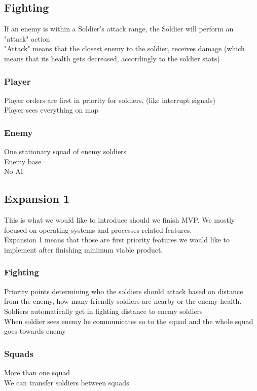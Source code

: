 \documentclass{article}
\begin{document}
\subsection{Fighting}
If an enemy is within a Soldier's attack range, the Soldier will perform an "attack" action\\
"Attack" means that the closest enemy to the soldier, receives damage (which means that its health gets decreased, accordingly to the soldier stats)

\subsubsection{Player}
Player orders are first in priority for soldiers, (like interrupt signals) \\ 
Player sees everything on map

\subsubsection{Enemy}
One stationary squad of enemy soldiers \\ 
Enemy base \\ 
No AI \\

\subsection{Expansion 1}
This is what we would like to introduce should we finish MVP. We mostly focused
on operating systems and processes related features. \\
Expansion 1 means that those are first priority features we would like to
implement after finishing minimum viable product. 
\subsubsection{Fighting}
Priority points determining who the soldiers should attack based on distance from the
enemy, how many friendly soldiers are nearby or the enemy health. \\ 
Soldiers automatically get in fighting distance to enemy soldiers \\ 
When soldier sees enemy he communicates so to the squad and the whole squad goes towards enemy

\subsubsection{Squads}
More than one squad \\ 
We can transfer soldiers between squads 
\end{document}
